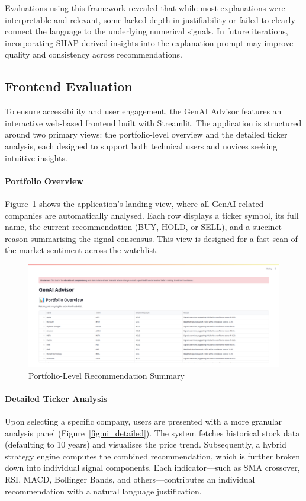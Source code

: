 Evaluations using this framework revealed that while most explanations were interpretable and relevant, some lacked depth in justifiability or failed to clearly connect the language to the underlying numerical signals. In future iterations, incorporating SHAP-derived insights into the explanation prompt may improve quality and consistency across recommendations.

\subsection{Frontend Evaluation}

To ensure accessibility and user engagement, the GenAI Advisor features an interactive web-based frontend built with Streamlit. The application is structured around two primary views: the portfolio-level overview and the detailed ticker analysis, each designed to support both technical users and novices seeking intuitive insights.

\paragraph{Portfolio Overview}
Figure~\ref{fig:ui_portfolio} shows the application’s landing view, where all GenAI-related companies are automatically analysed. Each row displays a ticker symbol, its full name, the current recommendation (BUY, HOLD, or SELL), and a succinct reason summarising the signal consensus. This view is designed for a fast scan of the market sentiment across the watchlist.

\begin{figure}[h]
\centering
\includegraphics[width=0.9\linewidth]{assets/ui1-portfolio_overview.png}
\caption{Portfolio-Level Recommendation Summary}
\label{fig:ui_portfolio}
\end{figure}

\paragraph{Detailed Ticker Analysis}
Upon selecting a specific company, users are presented with a more granular analysis panel (Figure~\ref{fig:ui_detailed}). The system fetches historical stock data (defaulting to 10 years) and visualises the price trend. Subsequently, a hybrid strategy engine computes the combined recommendation, which is further broken down into individual signal components. Each indicator—such as SMA crossover, RSI, MACD, Bollinger Bands, and others—contributes an individual recommendation with a natural language justification.

